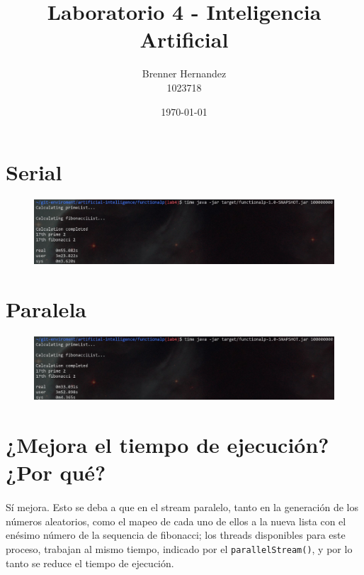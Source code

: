 \documentclass{article}
\title{Laboratorio 4 - Inteligencia Artificial}
\author{Brenner Hernandez \\ 1023718}
\date{\today}
\begin{document}
\maketitle

\section{Serial}

\begin{figure}[h!]
    \centering
    \includegraphics[width=1.0\textwidth]{serial.jpg}
    \label{fig:serial}
\end{figure}


\section{Paralela}

\begin{figure}[h!]
    \centering
    \includegraphics[width=1.0\textwidth]{parallel.jpg}
    \label{fig:parallel}
\end{figure}
\section{¿Mejora el tiempo de ejecución? ¿Por qué?}
\paragraph{}{\large Sí mejora. Esto se deba a que en el stream paralelo, tanto en la generación de los números aleatorios, como el mapeo de cada uno de ellos a la nueva lista con el enésimo número de la sequencia de fibonacci; los threads disponibles para este proceso, trabajan al mismo tiempo, indicado por el \texttt{parallelStream()}, y por lo tanto se reduce el tiempo de ejecución.}
\end{document}
